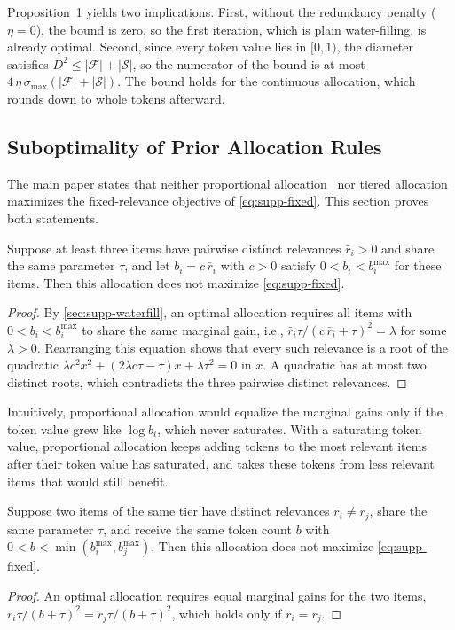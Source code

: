 \noindent Proposition~1 yields two implications. First, without the redundancy penalty ($\eta=0$), the bound is zero, so the first iteration, which is plain water-filling, is already optimal. Second, since every token value lies in $[0,1)$, the diameter satisfies $D^2\le|\mathcal F|+|\mathcal S|$, so the numerator of the bound is at most $4\,\eta\,\sigma_{\max}(|\mathcal F|+|\mathcal S|)$. The bound holds for the continuous allocation, which \name rounds down to whole tokens afterward.

\subsection{Suboptimality of Prior Allocation Rules}
\label{sec:supp-prior}

The main paper states that neither proportional allocation~\cite{luo2025quota} nor tiered allocation~\cite{zhang2025qframe} maximizes the fixed-relevance objective of \cref{eq:supp-fixed}. This section proves both statements.

\begin{lemma}
\label{lem:proportional}
Suppose at least three items have pairwise distinct relevances $\bar r_i>0$ and share the same parameter $\tau$, and let $b_i=c\,\bar r_i$ with $c>0$ satisfy $0<b_i<b_i^{\max}$ for these items. Then this allocation does not maximize \cref{eq:supp-fixed}.
\end{lemma}
\begin{proof}
By \cref{sec:supp-waterfill}, an optimal allocation requires all items with $0<b_i<b_i^{\max}$ to share the same marginal gain, i.e., $\bar r_i\tau/(c\,\bar r_i+\tau)^2=\lambda$ for some $\lambda>0$. Rearranging this equation shows that every such relevance is a root of the quadratic $\lambda c^2x^2+(2\lambda c\tau-\tau)x+\lambda\tau^2=0$ in $x$. A quadratic has at most two distinct roots, which contradicts the three pairwise distinct relevances.
\end{proof}

\noindent Intuitively, proportional allocation would equalize the marginal gains only if the token value grew like $\log b_i$, which never saturates. With a saturating token value, proportional allocation keeps adding tokens to the most relevant items after their token value has saturated, and takes these tokens from less relevant items that would still benefit.

\begin{lemma}
\label{lem:tiered}
Suppose two items of the same tier have distinct relevances $\bar r_i\ne\bar r_j$, share the same parameter $\tau$, and receive the same token count $b$ with $0<b<\min(b_i^{\max},b_j^{\max})$. Then this allocation does not maximize \cref{eq:supp-fixed}.
\end{lemma}
\begin{proof}
An optimal allocation requires equal marginal gains for the two items, $\bar r_i\tau/(b+\tau)^2=\bar r_j\tau/(b+\tau)^2$, which holds only if $\bar r_i=\bar r_j$.
\end{proof}


